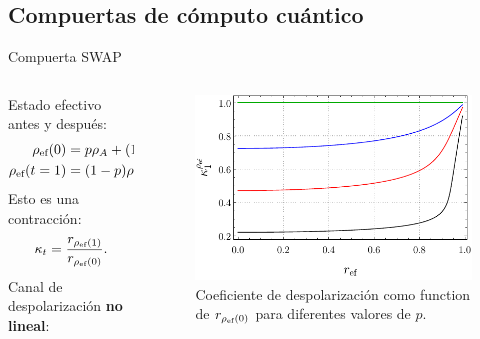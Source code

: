 \subsection{Compuertas de cómputo cuántico}
\begin{frame}{Compuerta SWAP}
    \begin{columns}
        \begin{column}{0.5\textwidth}
            Estado efectivo antes y después:
            \begin{align*}
                \rho_{\text{ef}}(0)&=p\rho_{A}+(1-p)\rho_{B},\\
                \rho_{\text{ef}}(t=1)&=(1-p)\rho_{A}+p\rho_{B}.
                \end{align*}\pause
                Esto es una contracción:
                \begin{equation*}
                    \kappa_{t}=\frac{r_{\rho_{\text{ef}}(1)}}{r_{\rho_{\text{ef}}(0)}}.
                  \end{equation*}\pause
                  Canal de despolarización \textbf{no lineal}:\pause
                  \begin{center}
                  \end{center}
        \end{column}\pause
        \begin{column}{0.5\textwidth}
            \begin{figure}[h!]
                \centering
                \includegraphics[width=0.9\linewidth]{figures/maxent_results/K(r).pdf}
                \caption{Coeficiente de despolarización como function de $r_{\rho_{\text{ef}}(0)}$ para diferentes valores de $p$.}
              \end{figure}
        \end{column}
    \end{columns}
\end{frame}
